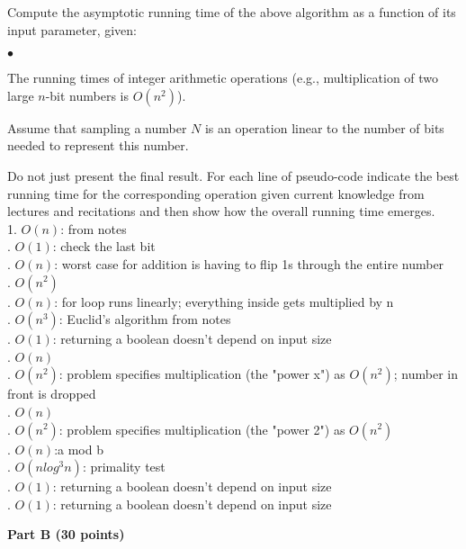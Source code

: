 \documentclass{article}
\newenvironment{myitem}{\begin{list}{$\bullet$}
{\setlength{\itemsep}{-0pt}
\setlength{\topsep}{0pt}
\setlength{\labelwidth}{0pt}
\setlength{\leftmargin}{10pt}
\setlength{\parsep}{-0pt}
\setlength{\itemsep}{0pt}
\setlength{\partopsep}{0pt}}}%
{\end{list}}
\begin{document}
 Compute the asymptotic running time of the
above algorithm as a function of its input parameter, given:

\begin{myitem}
\item The running times of integer arithmetic operations (e.g.,
  multiplication of two large $n$-bit numbers is $O(n^2)$).
\item Assume that sampling a number $N$ is an operation linear to the
  number of bits needed to represent this number.
\end{myitem}

\noindent Do not just present the final result. For each line of
pseudo-code indicate the best running time for the corresponding
operation given current knowledge from lectures and recitations and
then show how the overall running time emerges.\\

1. $O(n)$: from notes\\
. $O(1)$: check the last bit\\
. $O(n)$: worst case for addition is having to flip 1s through the entire number\\
. $O(n^2)$\\
. $O(n)$: for loop runs linearly; everything inside gets multiplied by n\\
. $O(n^3)$: Euclid's algorithm from notes\\
. $O(1)$: returning a boolean doesn't depend on input size\\
. $O(n)$\\
. $O(n^2)$: problem specifies multiplication (the "power x") as $O(n^2)$; number in front is dropped\\
. $O(n)$\\
. $O(n^2)$: problem specifies multiplication (the "power 2") as $O(n^2)$\\
. $O(n)$:a mod b\\
. $O(n log^3n)$: primality test\\
. $O(1)$: returning a boolean doesn't depend on input size\\
. $O(1)$: returning a boolean doesn't depend on input size\\

\begin{center}
{\bf Part B (30 points)}
\end{center}
\end{document}
